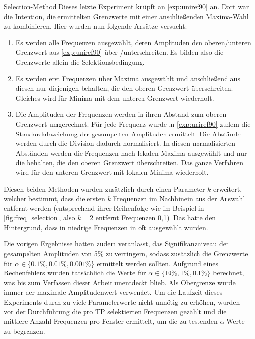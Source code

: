     \begin{experiment}{Selection-Method} %
        \label{exp:selection_method}
        Dieses letzte Experiment knüpft an \autoref{exp:uniref90} an. Dort war die Intention, die ermittelten Grenzwerte mit einer anschließenden Maxima-Wahl zu kombinieren. Hier wurden nun folgende Ansätze versucht:
    
        \begin{enumerate}
            \item Es werden alle Frequenzen ausgewählt, deren Amplituden den oberen/unteren Grenzwert aus \autoref{exp:uniref90} über-/unterschreiten. Es bilden also die Grenzwerte allein die Selektionsbedingung.
            \item Es werden erst Frequenzen über Maxima ausgewählt und anschließend aus diesen nur diejenigen behalten, die den oberen Grenzwert überschreiten. Gleiches wird für Minima mit dem unteren Grenzwert wiederholt.
            \item Die Amplituden der Frequenzen werden in ihren Abstand zum oberen Grenzwert umgerechnet. Für jede Frequenz wurde in \autoref{exp:uniref90} zudem die Standardabweichung der gesampelten Amplituden ermittelt. Die Abstände werden durch die Division dadurch normalisiert. In diesen normalisierten Abständen werden die Frequenzen nach lokalen Maxima ausgewählt und nur die behalten, die den oberen Grenzwert überschreiten. Das ganze Verfahren wird für den unteren Grenzwert mit lokalen Minima wiederholt.
        \end{enumerate}

        Diesen beiden Methoden wurden zusätzlich durch einen Parameter $k$ erweitert, welcher bestimmt, dass die ersten $k$ Frequenzen im Nachhinein aus der Auswahl entfernt werden (entsprechend ihrer Reihenfolge wie im Beispiel in \autoref{fig:freq_selection}, also $k=2$ entfernt Frequenzen 0,1). Das hatte den Hintergrund, dass in niedrige Frequenzen in  oft ausgewählt wurden.

        Die vorigen Ergebnisse hatten zudem veranlasst, das Signifikanzniveau der gesampelten Amplituden von 5\% zu verringern, sodass zusätzlich die Grenzwerte für $\alpha \in \{0.1\%, 0.01\%, 0.001\%\}$ ermittelt werden sollten. Aufgrund eines Rechenfehlers wurden tatsächlich die Werte für $\alpha \in \{10\%, 1\%, 0.1\%\}$ berechnet, was bis zum Verfassen dieser Arbeit unentdeckt blieb. Als Obergrenze wurde immer der maximale Amplitudenwert verwendet. Um die Laufzeit dieses Experiments durch zu viele Parameterwerte nicht unnötig zu erhöhen, wurden vor der Durchführung die pro \ac{TP} selektierten Frequenzen gezählt und die mittlere Anzahl Frequenzen pro Fenster ermittelt, um die zu testenden $\alpha$-Werte zu begrenzen.


\end{experiment}
